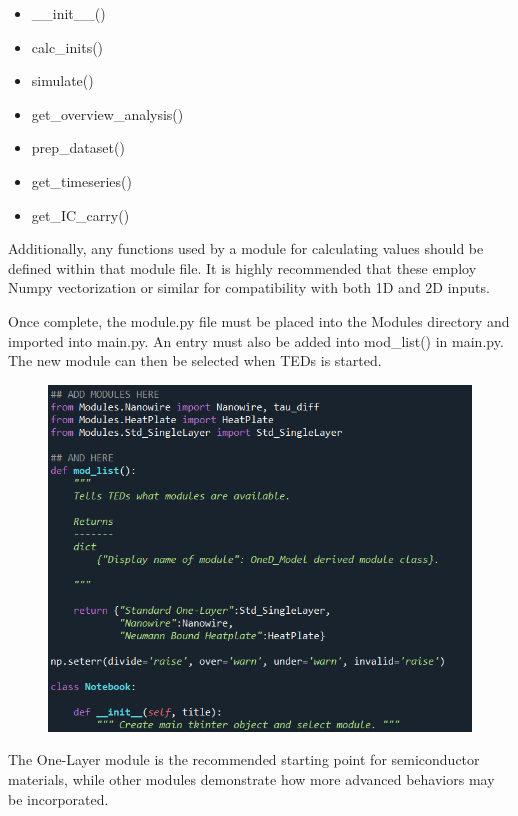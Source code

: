 \documentclass[11pt,letterpaper,titlepage]{article}
\begin{document}
		\begin{itemize}
			\item \_\_init\_\_()
			\item calc\_inits()
			\item simulate()
			\item get\_overview\_analysis()
			\item prep\_dataset()
			\item get\_timeseries()
			\item get\_IC\_carry()
		\end{itemize}
	
		\par Additionally, any functions used by a module for calculating values should be defined within that module file. It is highly recommended that these employ Numpy vectorization or similar for compatibility with both 1D and 2D inputs.
	
		\par Once complete, the module.py file must be placed into the Modules directory and imported into main.py. An entry must also be added into mod\_list() in main.py. The new module can then be selected when TEDs is started.
		
		\begin{figure}[H]
			\label{fig:modules_here}
			\centering
			\includegraphics[scale=0.9]{"modules_here"}
		\end{figure}
	
		\par The One-Layer module is the recommended starting point for semiconductor materials, while other modules demonstrate how more advanced behaviors may be incorporated.
		
\end{document}
